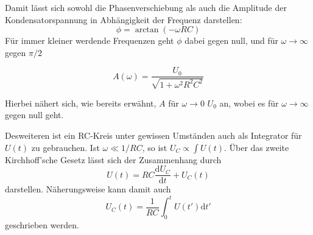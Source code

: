 Damit lässt sich sowohl die Phasenverschiebung als auch die Amplitude der Kondensatorspannung in Abhängigkeit der Frequenz 
darstellen: \begin{equation}
    \phi = \arctan(-\omega RC)
\end{equation}
Für immer kleiner werdende Frequenzen geht $\phi$ dabei gegen null, und für $\omega \to \infty$ gegen $\pi/2$

\begin{equation}
    A(\omega) = \frac{U_0}{\sqrt{1 + \omega^2 R^2 C^2}}
\end{equation}

Hierbei nähert sich, wie bereits erwähnt, $A$ für $\omega \to 0$ $U_0$ an, wobei es für $\omega \to \infty$ gegen null geht. 

Desweiteren ist ein RC-Kreis unter gewissen Umständen auch als Integrator für $U(t)$ zu gebrauchen. Ist $\omega \ll 1/RC$, so ist
$U_C \propto \int U(t)$. Über das zweite Kirchhoff'sche Gesetz lässt sich der Zusammenhang durch \begin{equation}
    U(t) = RC \frac{\text{d}U_C}{\text{d}t} + U_C (t)
\end{equation} darstellen.
Näherungsweise kann damit auch \begin{equation}
    U_C (t) = \frac{1}{RC} \int_0^t U(t') \text{d} t'
\end{equation} geschrieben werden.
